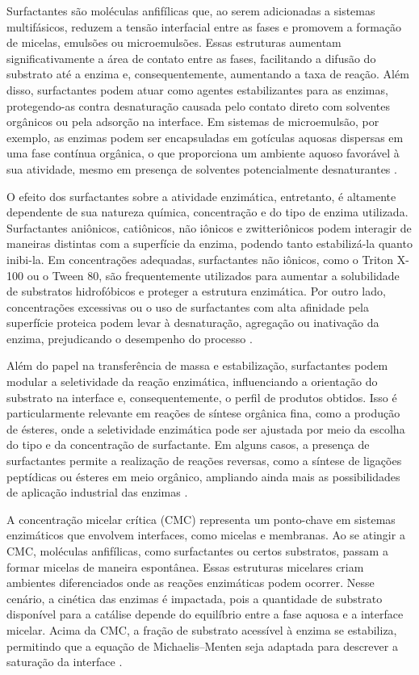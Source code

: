 \documentclass[12pt,oneside]{report}
\begin{document}
Surfactantes são moléculas anfifílicas que, ao serem adicionadas a sistemas multifásicos, reduzem a tensão interfacial entre as fases e promovem a formação de micelas, emulsões ou microemulsões. Essas estruturas aumentam significativamente a área de contato entre as fases, facilitando a difusão do substrato até a enzima e, consequentemente, aumentando a taxa de reação. Além disso, surfactantes podem atuar como agentes estabilizantes para as enzimas, protegendo-as contra desnaturação causada pelo contato direto com solventes orgânicos ou pela adsorção na interface. Em sistemas de microemulsão, por exemplo, as enzimas podem ser encapsuladas em gotículas aquosas dispersas em uma fase contínua orgânica, o que proporciona um ambiente aquoso favorável à sua atividade, mesmo em presença de solventes potencialmente desnaturantes \cite{lau2010surfactants}.

O efeito dos surfactantes sobre a atividade enzimática, entretanto, é altamente dependente de sua natureza química, concentração e do tipo de enzima utilizada. Surfactantes aniônicos, catiônicos, não iônicos e zwitteriônicos podem interagir de maneiras distintas com a superfície da enzima, podendo tanto estabilizá-la quanto inibi-la. Em concentrações adequadas, surfactantes não iônicos, como o Triton X-100 ou o Tween 80, são frequentemente utilizados para aumentar a solubilidade de substratos hidrofóbicos e proteger a estrutura enzimática. Por outro lado, concentrações excessivas ou o uso de surfactantes com alta afinidade pela superfície proteica podem levar à desnaturação, agregação ou inativação da enzima, prejudicando o desempenho do processo \cite{lau2010surfactants}.

Além do papel na transferência de massa e estabilização, surfactantes podem modular a seletividade da reação enzimática, influenciando a orientação do substrato na interface e, consequentemente, o perfil de produtos obtidos. Isso é particularmente relevante em reações de síntese orgânica fina, como a produção de ésteres, onde a seletividade enzimática pode ser ajustada por meio da escolha do tipo e da concentração de surfactante. Em alguns casos, a presença de surfactantes permite a realização de reações reversas, como a síntese de ligações peptídicas ou ésteres em meio orgânico, ampliando ainda mais as possibilidades de aplicação industrial das enzimas \cite{lau2010surfactants}.

A concentração micelar crítica (CMC) representa um ponto-chave em sistemas enzimáticos que envolvem interfaces, como micelas e membranas. Ao se atingir a CMC, moléculas anfifílicas, como surfactantes ou certos substratos, passam a formar micelas de maneira espontânea. Essas estruturas micelares criam ambientes diferenciados onde as reações enzimáticas podem ocorrer. Nesse cenário, a cinética das enzimas é impactada, pois a quantidade de substrato disponível para a catálise depende do equilíbrio entre a fase aquosa e a interface micelar. Acima da CMC, a fração de substrato acessível à enzima se estabiliza, permitindo que a equação de Michaelis--Menten seja adaptada para descrever a saturação da interface \cite{bisswanger2017}.
\end{document}
